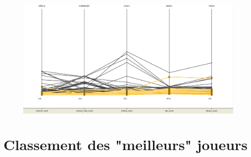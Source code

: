 \documentclass[11pt, a4paper, titlepage]{scrartcl}
\begin{document}
\begin{figure}[h]
    \centering
    \includegraphics[width=\textwidth]{images/featured_influence}
    \caption{}
\end{figure}


\section{Classement des "meilleurs" joueurs}

\end{document}
